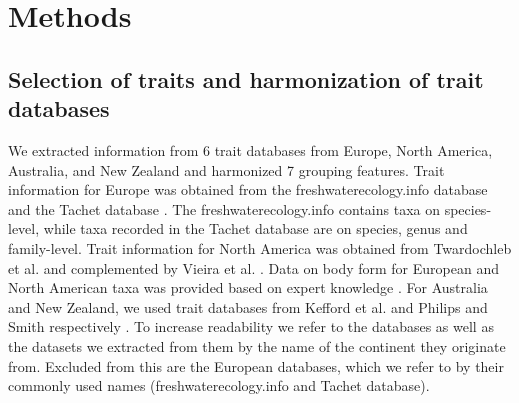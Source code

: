 \documentclass{article}
\begin{document}
\newpage


\section*{Methods}

\subsection*{Selection of traits and harmonization of trait databases}

We extracted information from 6 trait databases from Europe, North America, Australia, and New Zealand and harmonized 7 grouping features. Trait information for Europe was obtained from the freshwaterecology.info database \cite{schmidt-kloiber_www.freshwaterecology.info_2015} and the Tachet database \cite{usseglio-polatera_biomonitoring_2000}. The freshwaterecology.info contains taxa on species-level, while taxa recorded in the Tachet database are on species, genus and family-level.
Trait information for North America was obtained from Twardochleb et al. \cite{twardochleb_trait_data_2020} and complemented by Vieira et al. \cite{vieira_database_nodate}. Data on body form for European and North American taxa was provided based on expert knowledge \cite{polatera_personal_information_2020}. For Australia and New Zealand, we used trait databases from Kefford et al. \cite{kefford_integrated_2020} and Philips and Smith respectively \cite{Philips_and_Smith_NZ_DB_2018}. To increase readability we refer to the databases as well as the datasets we extracted from them by the name of the continent they originate from. Excluded from this are the European databases, which we refer to by their commonly used names (freshwaterecology.info and Tachet database). 
\end{document}
